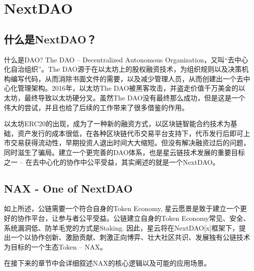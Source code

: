 \section{NextDAO}
\subsection{什么是NextDAO？}
什么是DAO? The DAO -- Decentralized Autonomous Organization，又叫“去中心化自治组织”。The DAO源于在以太坊上的股权融资技术，为组织规则以及决策机构编写代码，从而消除书面文件的需要，以及减少管理人员，从而创建出一个去中心化管理架构。2016年，以太坊The DAO被黑客攻击，并盗走价值千万美金的以太坊，最终导致以太坊硬分叉。虽然The DAO没有最终那么成功，但是这是一个伟大的尝试，并且也给了后续的工作带来了很多借鉴的作用。

以太坊ERC20的出现，成为了一种新的融资方式，以区块链智能合约技术为基础，资产发行的成本很低，在各种区块链代币交易平台支持下，代币发行后即可上市交易获得流动性，早期投资人退出时间大大缩短。但没有解决融资过后的问题，同时滋生了骗局。建立一个更完善的DAO体系，也是星云链技术发展的重要目标之一 -- 在去中心化的协作中公平受益，其实阐述的就是一个NextDAO。

\subsection{NAX - One of NextDAO}
如上所述，公链需要一个符合自身的Token Economy, 星云愿景是致于建立一个更好的协作平台，让参与者公平受益。公链建立自身的Token Economy常见、安全、系统漏洞低、防羊毛党的方式是Staking. 因此，星云将在NextDAO[x]框架下，提出一个以协作创新、激励贡献、刺激正向博弈、壮大社区共识、发展独有公链技术为目标的一个生态Token -- NAX。

在接下来的章节中会详细叙述NAX的核心逻辑以及可能的应用场景。
